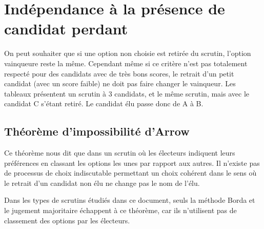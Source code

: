 \documentclass[../report]{subfiles}
\begin{document}
  \section{Indépendance à la présence de candidat perdant}

  On peut souhaiter que si une option non choisie est retirée du scrutin, l'option vainqueure reste
  la même.
  Cependant même si ce critère n'est pas totalement respecté pour des candidats avec de très bons 
  scores, le retrait d'un petit candidat (avec un score faible) ne doit pas faire changer 
  le vainqueur.
  Les tableaux  présentent un scrutin à 3 candidats, et le même 
  scrutin, mais avec le candidat C s'étant retiré. Le candidat élu passe donc de A à B.

  \subsection{Théorème d'impossibilité d'Arrow}

  Ce théorème nous dit que dans un scrutin où les électeurs indiquent leurs préférences en classant les
  options les unes par rapport aux autres.
  Il n'existe pas de processus de choix indiscutable permettant un choix 
  cohérent dans le sens où le retrait d'un candidat non élu ne change pas le nom de l'élu.

  Dans les types de scrutins étudiés dans ce document, seuls la méthode Borda et le 
  jugement majoritaire échappent à ce théorème, car ils n'utilisent pas de classement des 
  options par les électeurs.
  
\end{document}
